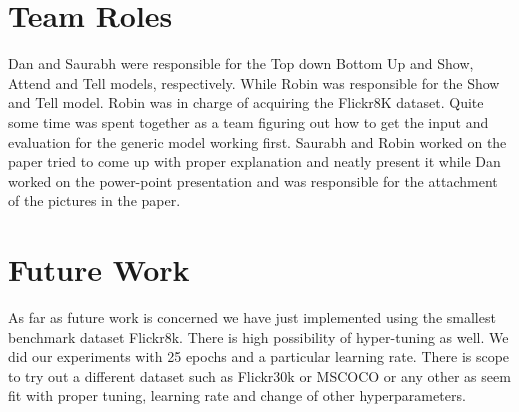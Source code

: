 \documentclass[a4paper]{article}
\begin{document}
\section{Team Roles}
Dan and Saurabh were responsible for the Top down Bottom Up and Show, Attend and Tell models, respectively. While Robin was responsible for the Show and Tell model. Robin was in charge of acquiring the Flickr8K dataset. Quite some time was spent together as a team figuring out how to get the input and evaluation for the generic model working first. Saurabh and Robin worked on the paper tried to come up with proper explanation and neatly present it while Dan worked on the power-point presentation and was responsible for the attachment of the pictures in the paper.

\section{Future Work}
As far as future work is concerned we have just implemented using the smallest benchmark dataset Flickr8k. There is high possibility of hyper-tuning as well. We did our experiments with 25 epochs and a particular learning rate. There is scope to try out a different dataset such as Flickr30k or MSCOCO or any other as seem fit with proper tuning, learning rate and change of other hyperparameters.



\end{document}
